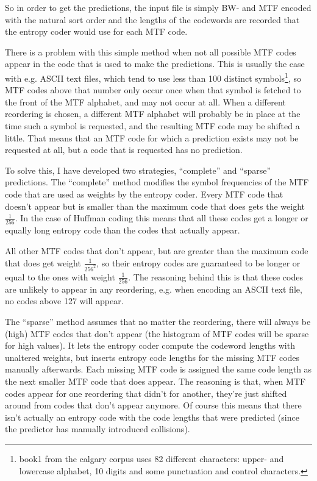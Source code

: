 \documentclass[a4paper]{scrreprt}
\begin{document}
So in order to get the predictions, the input file is simply BW- and MTF encoded
with the natural sort order and the lengths of the codewords are recorded that
the entropy coder would use for each MTF code.

There is a problem with this simple method when not all possible MTF codes
appear in the code that is used to make the predictions. This is usually the
case with e.g. ASCII text files, which tend to use less than 100 distinct
symbols\footnote{book1 from the calgary corpus uses 82 different characters:
upper- and lowercase alphabet, 10 digits and some punctuation and control
characters.}, so MTF codes above that number only occur once when that symbol is
fetched to the front of the MTF alphabet, and may not occur at all.
When a different reordering is chosen, a different MTF alphabet will probably be
in place at the time such a symbol is requested, and the resulting MTF code may
be shifted a little. That means that an MTF code for which a prediction exists
may not be requested at all, but a code that is requested has no prediction.

To solve this, I have developed two strategies, ``complete'' and ``sparse''
predictions.
The ``complete'' method modifies the symbol frequencies of the MTF code that are
used as weights by the entropy coder. Every MTF code that doesn't appear but is
smaller than the maximum code that does gets the weight \(\frac{1}{256}\). In
the case of Huffman coding this means that all these codes get a longer or
equally long entropy code than the codes that actually appear.

All other MTF codes that don't appear, but are greater than the maximum code
that does get weight \(\frac{1}{256^2}\), so their entropy codes are guaranteed
to be longer or equal to the ones with weight \(\frac{1}{256}\). The reasoning
behind this is that these codes are unlikely to appear in any reordering, e.g.
when encoding an ASCII text file, no codes above 127 will appear.

The ``sparse'' method assumes that no matter the reordering, there will always
be (high) MTF codes that don't appear (the histogram of MTF codes will be
sparse for high values).
It lets the entropy coder compute the codeword lengths with unaltered weights,
but inserts entropy code lengths for the missing MTF codes manually afterwards.
Each missing MTF code is assigned the same code length as the next smaller MTF
code that does appear. The reasoning is that, when MTF codes appear for one
reordering that didn't for another, they're just shifted around from codes that
don't appear anymore. Of course this means that there isn't actually an entropy
code with the code lengths that were predicted (since the predictor has
manually introduced collisions).
\end{document}
